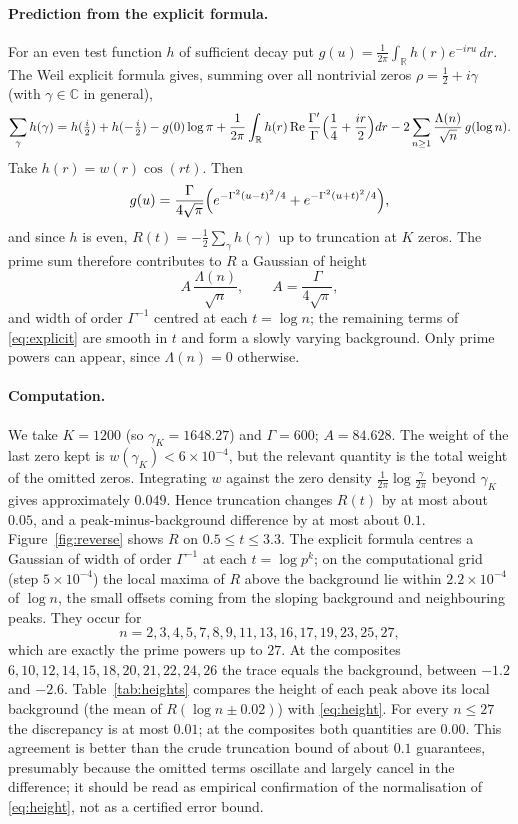 \documentclass[11pt,a4paper]{article}
\theoremstyle{definition}\newtheorem{definition}[proposition]{Definition}
\theoremstyle{remark}\newtheorem{remark}[proposition]{Remark}
\newcommand{\R}{\mathbb R}\newcommand{\C}{\mathbb C}\newcommand{\Z}{\mathbb Z}
\begin{document}
\paragraph{Prediction from the explicit formula.} For an even test function $h$ of sufficient decay put $g(u)=\frac1{2\pi}\int_\R h(r)e^{-iru}\,dr$. The Weil explicit formula \cite{Weil1952} gives, summing over all nontrivial zeros $\rho=\tfrac12+i\gamma$ (with $\gamma\in\C$ in general),
\begin{equation}\label{eq:explicit}
\sum_{\gamma}h(\gamma)=h(\tfrac i2)+h(-\tfrac i2)-g(0)\log\pi+\frac1{2\pi}\int_\R h(r)\,\mathrm{Re}\,\frac{\Gamma'}{\Gamma}\Bigl(\frac14+\frac{ir}2\Bigr)dr-2\sum_{n\ge1}\frac{\Lambda(n)}{\sqrt n}\,g(\log n).
\end{equation}
Take $h(r)=w(r)\cos(rt)$. Then
\[
g(u)=\frac{\Gamma}{4\sqrt\pi}\Bigl(e^{-\Gamma^2(u-t)^2/4}+e^{-\Gamma^2(u+t)^2/4}\Bigr),
\]
and since $h$ is even, $R(t)=-\tfrac12\sum_\gamma h(\gamma)$ up to truncation at $K$ zeros. The prime sum therefore contributes to $R$ a Gaussian of height
\begin{equation}\label{eq:height}
A\,\frac{\Lambda(n)}{\sqrt n},\qquad A=\frac{\Gamma}{4\sqrt\pi},
\end{equation}
and width of order $\Gamma^{-1}$ centred at each $t=\log n$; the remaining terms of \eqref{eq:explicit} are smooth in $t$ and form a slowly varying background. Only prime powers can appear, since $\Lambda(n)=0$ otherwise.

\paragraph{Computation.} We take $K=1200$ (so $\gamma_K=1648.27$) and $\Gamma=600$; $A=84.628$. The weight of the last zero kept is $w(\gamma_K)<6\times10^{-4}$, but the relevant quantity is the total weight of the omitted zeros. Integrating $w$ against the zero density $\frac1{2\pi}\log\frac{\gamma}{2\pi}$ beyond $\gamma_K$ gives approximately $0.049$. Hence truncation changes $R(t)$ by at most about $0.05$, and a peak-minus-background difference by at most about $0.1$. Figure~\ref{fig:reverse} shows $R$ on $0.5\le t\le3.3$. The explicit formula centres a Gaussian of width of order $\Gamma^{-1}$ at each $t=\log p^k$; on the computational grid (step $5\times10^{-4}$) the local maxima of $R$ above the background lie within $2.2\times10^{-4}$ of $\log n$, the small offsets coming from the sloping background and neighbouring peaks. They occur for
\[
n=2,3,4,5,7,8,9,11,13,16,17,19,23,25,27,
\]
which are exactly the prime powers up to $27$. At the composites $6,10,12,14,15,18,20,21,22,24,26$ the trace equals the background, between $-1.2$ and $-2.6$. Table~\ref{tab:heights} compares the height of each peak above its local background (the mean of $R(\log n\pm0.02)$) with \eqref{eq:height}. For every $n\le27$ the discrepancy is at most $0.01$; at the composites both quantities are $0.00$. This agreement is better than the crude truncation bound of about $0.1$ guarantees, presumably because the omitted terms oscillate and largely cancel in the difference; it should be read as empirical confirmation of the normalisation of \eqref{eq:height}, not as a certified error bound.
\end{document}
